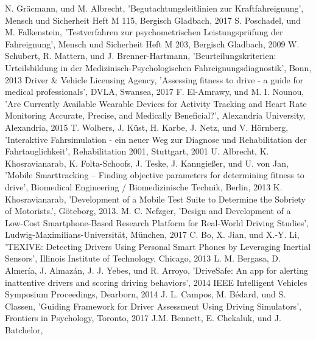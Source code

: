 \documentclass[conference]{IEEEtran}
\begin{document}
\begin{thebibliography}{00}

 N. Gräcmann, und M. Albrecht, 'Begutachtungsleitlinien zur Kraftfahreignung', Mensch und Sicherheit Heft M 115, Bergisch Gladbach, 2017
 S. Poschadel, und M. Falkenstein, 'Testverfahren zur psychometrischen Leistungsprüfung der Fahreignung', Mensch und Sicherheit Heft M 203, Bergisch Gladbach, 2009
 W. Schubert, R. Mattern, und J. Brenner-Hartmann, 'Beurteilungskriterien: Urteilsbildung in der Medizinisch-Psychologischen Fahreignungsdiagnostik', Bonn, 2013
 Driver \& Vehicle Licensing Agency, 'Assessing fitness to drive - a guide for medical professionals', DVLA, Swansea, 2017
 F. El-Amrawy, und M. I. Nounou, 'Are Currently Available Wearable Devices for Activity Tracking and Heart Rate Monitoring Accurate, Precise, and Medically Beneficial?', Alexandria University, Alexandria, 2015
 T. Wolbers, J. Küst, H. Karbe, J. Netz, und V. Hörnberg, 'Interaktive Fahrsimulation - ein neuer Weg zur Diagnose und Rehabilitation der Fahrtauglichkeit', Rehabilitation 2001, Stuttgart, 2001
 U. Albrecht, K. Khosravianarab, K. Folta-Schoofs, J. Teske, J. Kanngießer, und U. von Jan, 'Mobile Smarttracking – Finding objective parameters for determining fitness to drive', Biomedical Engineering / Biomedizinische Technik, Berlin, 2013
K. Khosravianarab, 'Development of a Mobile Test Suite to Determine the Sobriety of Motorists.', Göteborg, 2013.
 M. C. Nefzger, 'Design and Development of a Low-Cost Smartphone-Based Research Platform for Real-World Driving Studies', Ludwig-Maximilians-Universität, München, 2017
 C. Bo, X. Jian, und X.-Y. Li, 'TEXIVE: Detecting Drivers Using Personal Smart Phones
by Leveraging Inertial Sensors',  Illinois Institute of Technology, Chicago, 2013
 L. M. Bergasa, D. Almería, J. Almazán, J. J. Yebes, und R. Arroyo, 'DriveSafe: An app for alerting inattentive drivers and scoring driving behaviors', 2014 IEEE Intelligent Vehicles Symposium Proceedings, Dearborn, 2014
J. L. Campos, M. Bédard, und S. Classen, 'Guiding Framework for Driver Assessment Using Driving Simulators', Frontiers in Psychology, Toronto, 2017
J.M. Bennett, E. Chekaluk, und J. Batchelor,

\end{thebibliography}
\end{document}
